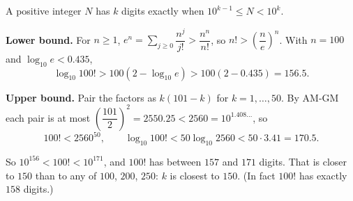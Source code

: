 A positive integer $N$ has $k$ digits exactly when $10^{k-1}\le N<10^k$.

\textbf{Lower bound.} For $n\ge1$, $e^n=\sum_{j\ge0}\dfrac{n^j}{j!}>\dfrac{n^n}{n!}$, so $n!>\left(\dfrac {n}{e}\right)^n$. With $n=100$ and $\log_{10}e<0.435$,
\[
\log_{10}100!>100\left(2-\log_{10}e\right)>100(2-0.435)=156.5 .
\]

\textbf{Upper bound.} Pair the factors as $k(101-k)$ for $k=1,\dots,50$. By AM-GM each pair is at most $\left(\dfrac{101}{2}\right)^2=2550.25<2560=10^{1.408\ldots}$, so
\[
100!<2560^{50},\qquad \log_{10}100!<50\log_{10}2560<50\cdot3.41=170.5 .
\]

So $10^{156}<100!<10^{171}$, and $100!$ has between $157$ and $171$ digits. That is closer to $150$ than to any of $100$, $200$, $250$: $k$ is closest to $\boxed{150}$. (In fact $100!$ has exactly $158$ digits.)
